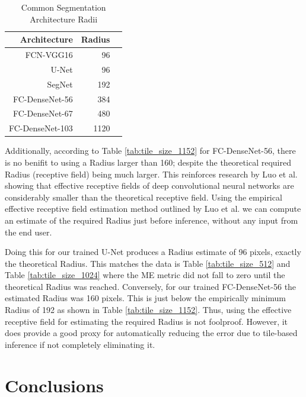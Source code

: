 \documentclass[runningheads]{llncs}
\begin{document}
\begin{table}[h!]
	\centering
	\caption{Common Segmentation Architecture Radii}
	\label{tab:common_radii}
	\begin{tabular}{r|r|r}
		Architecture & Radius &  \\ 
		\hline
		FCN-VGG16 \cite{Long2015} & 96 \\
		U-Net \cite{Ronneberger2015a} & 96 \\
		SegNet \cite{Badrinarayanan2015a} & 192 \\
		FC-DenseNet-56 \cite{Jegou2017} & 384 \\
		FC-DenseNet-67 \cite{Jegou2017} & 480 \\
		FC-DenseNet-103 \cite{Jegou2017} & 1120 \\
	\end{tabular}
\end{table}

Additionally, according to Table \ref{tab:tile_size_1152} for FC-DenseNet-56, there is no benifit to using a Radius larger than 160; despite the theoretical required Radius (receptive field) being much larger. This reinforces research by Luo et al. \cite{Luo2016} showing that effective receptive fields of deep convolutional neural networks are considerably smaller than the theoretical receptive field. Using the empirical effective receptive field estimation method outlined by Luo et al. \cite{Luo2016} we can compute an estimate of the required Radius just before inference, without any input from the end user. 

Doing this for our trained U-Net \cite{Ronneberger2015a} produces a Radius estimate of 96 pixels, exactly the theoretical Radius. This matches the data is Table \ref{tab:tile_size_512} and Table \ref{tab:tile_size_1024} where the ME metric did not fall to zero until the theoretical Radius was reached. Conversely, for our trained FC-DenseNet-56 the estimated Radius was 160 pixels. This is just below the empirically minimum Radius of 192 as shown in Table \ref{tab:tile_size_1152}. Thus, using the effective receptive field for estimating the required Radius is not foolproof. However, it does provide a good proxy for automatically reducing the error due to tile-based inference if not completely eliminating it. 


\section{Conclusions}
\label{conclusion}
\end{document}
